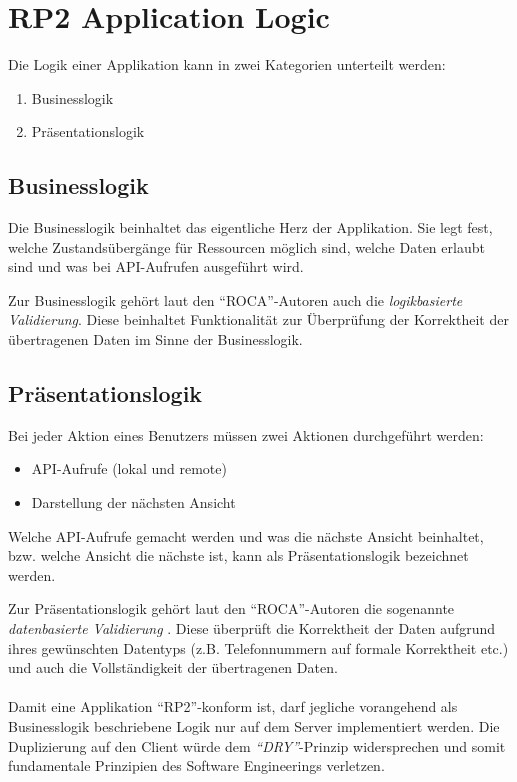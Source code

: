 \section{RP2 Application Logic}
\label{sec:principle-rp2-application-logic}

Die Logik einer Applikation kann in zwei Kategorien unterteilt werden:
\begin{enumerate}
	\item Businesslogik
	\item Präsentationslogik
\end{enumerate}

\subsection*{Businesslogik}
Die Businesslogik beinhaltet das eigentliche Herz der Applikation. Sie legt fest, welche Zustandsübergänge für Ressourcen möglich sind, welche Daten erlaubt sind und was bei API-Aufrufen ausgeführt wird.

Zur Businesslogik gehört laut den ``ROCA''-Autoren auch die \emph{logikbasierte Validierung}. Diese beinhaltet \cite{ObjektspektrumROCA} Funktionalität zur Überprüfung der Korrektheit der übertragenen Daten im Sinne der Businesslogik.

\subsection*{Präsentationslogik}
Bei jeder Aktion eines Benutzers müssen zwei Aktionen durchgeführt werden:
\begin{itemize}
	\item API-Aufrufe (lokal und remote)
	\item Darstellung der nächsten Ansicht
\end{itemize}
Welche API-Aufrufe gemacht werden und was die nächste Ansicht beinhaltet, bzw. welche Ansicht die nächste ist, kann als Präsentationslogik bezeichnet werden.

Zur Präsentationslogik gehört laut den ``ROCA''-Autoren die sogenannte \emph{datenbasierte Validierung} \cite{ObjektspektrumROCA}. Diese überprüft die Korrektheit der Daten aufgrund ihres gewünschten Datentyps (z.B. Telefonnummern auf formale Korrektheit etc.) und auch die Vollständigkeit der übertragenen Daten.
\\ \\
Damit eine Applikation ``RP2''-konform ist, darf jegliche vorangehend als Businesslogik beschriebene Logik nur auf dem Server implementiert werden. Die Duplizierung auf den Client würde dem \emph{``\gls{DRY}''}-Prinzip widersprechen und somit fundamentale Prinzipien des Software Engineerings verletzen.

